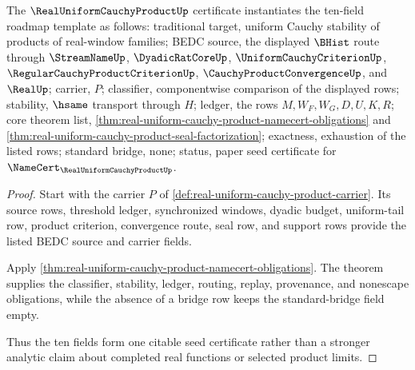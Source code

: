 \begin{theorem}
\label{thm:real-uniform-cauchy-product-ten-field-package}
The $\RealUniformCauchyProductUp$ certificate instantiates the ten-field roadmap template as follows: traditional target, uniform Cauchy stability of products of real-window families; BEDC source, the displayed $\BHist$ route through $\StreamNameUp$, $\DyadicRatCoreUp$, $\UniformCauchyCriterionUp$, $\RegularCauchyProductCriterionUp$, $\CauchyProductConvergenceUp$, and $\RealUp$; carrier, $P$; classifier, componentwise comparison of the displayed rows; stability, $\hsame$ transport through $H$; ledger, the rows $M,W_F,W_G,D,U,K,R$; core theorem list, \autoref{thm:real-uniform-cauchy-product-namecert-obligations} and \autoref{thm:real-uniform-cauchy-product-seal-factorization}; exactness, exhaustion of the listed rows; standard bridge, none; status, paper seed certificate for $\NameCert_{\RealUniformCauchyProductUp}$.
\end{theorem}
\begin{proof}
Start with the carrier $P$ of \autoref{def:real-uniform-cauchy-product-carrier}. Its source rows, threshold ledger, synchronized windows, dyadic budget, uniform-tail row, product criterion, convergence route, seal row, and support rows provide the listed BEDC source and carrier fields.

Apply \autoref{thm:real-uniform-cauchy-product-namecert-obligations}. The theorem supplies the classifier, stability, ledger, routing, replay, provenance, and nonescape obligations, while the absence of a bridge row keeps the standard-bridge field empty.

Thus the ten fields form one citable seed certificate rather than a stronger analytic claim about completed real functions or selected product limits.
\end{proof}


